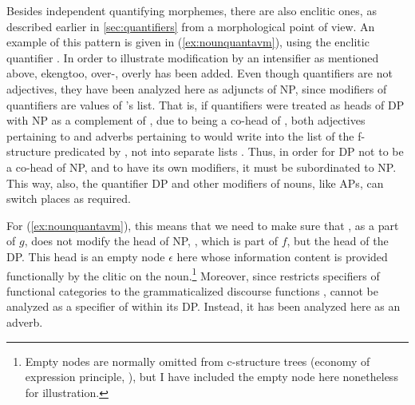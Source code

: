 Besides independent quantifying morphemes, there are also enclitic ones, as
described earlier in \autoref{sec:quantifiers} from a morphological point of
view. An example of this pattern is given in (\ref{ex:nounquantavm}), using the
enclitic quantifier . In order to
illustrate modification by an intensifier as mentioned above, 
{ekeng}{too, over-, overly} has been added. Even though quantifiers are not
adjectives, they have been analyzed here as adjuncts of NP, since modifiers of
quantifiers are values of \Quant{}'s \Adjc{} list. That is, if quantifiers were
treated as heads of DP with NP as a complement of , due to 
being a co-head of , both adjectives pertaining to  and
adverbs pertaining to  would write into the \Adjc{} list of the
f-structure predicated by , not into separate lists \citep[106]
{bresnan2016}. Thus, in order for DP not to be a co-head of NP, and to have its
own modifiers, it must be subordinated to NP. This way, also, the quantifier DP
and other modifiers of nouns, like APs, can switch places as required.

For (\ref{ex:nounquantavm}), this means that we need to make sure that
, as a part of $g$, does not modify the head of NP, 
, which is part of $f$, but the head of the DP. This
head is an empty node $\epsilon$ here whose information content is provided
functionally by the clitic  on the noun.\footnote{Empty
nodes are normally omitted from c-structure trees (economy of expression
principle, \cite [119--124]{bresnan2016}), but I have included the empty node
here nonetheless for illustration.} Moreover, since \Lfg{} restricts specifiers
of functional categories to the grammaticalized discourse functions
\citep[106--107]{bresnan2016},  cannot be analyzed as a
specifier of  within its DP. Instead, it has been analyzed here as an
adverb.

